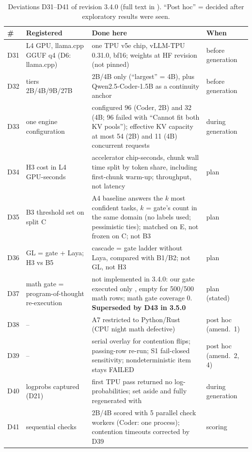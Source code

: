 \documentclass[11pt,a4paper]{article}
\newcommand{\code}[1]{\texttt{\detokenize{#1}}}
\begin{document}
\begin{table}[!htbp]\centering\scriptsize\setlength{\tabcolsep}{4pt}
\caption{Deviations D31--D41 of revision 3.4.0 (full text in \code{docs/DEVIATIONS.md}). ``Post hoc'' = decided after exploratory results were seen.}
\label{tab:dev34}
\begin{tabular}{l p{4.2cm} p{6.6cm} p{2.0cm}}\toprule
\# & Registered & Done here & When\\\midrule
D31 & L4 GPU, llama.cpp GGUF q4 (D6: llama.cpp) & one TPU v5e chip, vLLM-TPU 0.31.0, bf16; weights at HF revision \code{main} (not pinned) & before generation\\
D32 & tiers 2B/4B/9B/27B & 2B/4B only (``largest'' = 4B), plus Qwen2.5-Coder-1.5B as a continuity anchor & before generation\\
D33 & one engine configuration & configured \code{max_num_seqs} 96 (Coder, 2B) and 32 (4B; 96 failed with ``Cannot fit both KV pools''); effective KV capacity at most 54 (2B) and 11 (4B) concurrent requests & during generation\\
D34 & H3 cost in L4 GPU-seconds & accelerator chip-seconds, chunk wall time split by token share, including first-chunk warm-up; throughput, not latency & plan\\
D35 & B3 threshold set on split C & A4 baseline answers the $k$ most confident tasks, $k$ = gate's count in the same domain (no labels used; pessimistic ties); matched on E, not frozen on C; not B3 & plan\\
D36 & GL = gate + Laya; H3 vs B5 & cascade = gate ladder without Laya, compared with B1/B2; not GL, not H3 & plan\\
D37 & math gate = program-of-thought re-execution & not implemented in 3.4.0: our gate executed only \code{gate_payload}, empty for 500/500 math rows; math gate coverage 0. \textbf{Superseded by D43 in 3.5.0} & plan (stated)\\
D38 & -- & A7 restricted to Python/Rust (CPU night math defective) & post hoc (amend.\ 1)\\
D39 & -- & serial overlay for contention flips; passing-row re-run; S1 fail-closed sensitivity; nondeterministic item stays FAILED & post hoc (amend.\ 2, 4)\\
D40 & logprobs captured (D21) & first TPU pass returned no log-probabilities; set aside and fully regenerated with \code{logprobs=1} & during generation\\
D41 & sequential checks & 2B/4B scored with 5 parallel check workers (Coder: one process); contention timeouts corrected by D39 & scoring\\
\bottomrule\end{tabular}\end{table}
\end{document}
